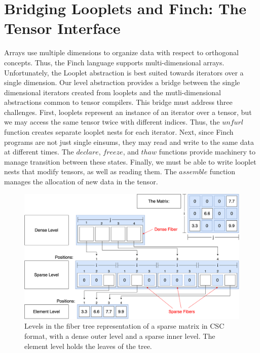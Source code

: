 \section{Bridging Looplets and Finch: The Tensor Interface}
%
%
%
%
Arrays use multiple dimensions to organize data with respect to orthogonal concepts.
%
Thus, the Finch language supports multi-dimensional arrays.
%
Unfortunately, the Looplet abstraction is best suited towards iterators over a single dimension.
%
Our level abstraction provides a bridge between the single dimensional iterators created from looplets and the mutli-dimensional abstractions common to tensor compilers.
% 
This bridge must address three challenges.
%
First, looplets represent an instance of an iterator over a tensor, but we may access the same tensor twice with different indices.
%
Thus, the $unfurl$ function creates separate looplet nests for each iterator.
%
Next, since Finch programs are not just single einsums, they may read and write to the same data at different times.
%
The $declare$, $freeze$, and $thaw$ functions provide machinery to manage transition between these states.
%
Finally, we must be able to write looplet nests that modify tensors, as well as reading them.
%
The $assemble$ function manages the allocation of new data in the tensor.

\begin{figure}
    \centering
    \vspace{-8pt}
    \includegraphics[width=\linewidth]{LevelsVsFibers-matrix.png}
    \vspace{-8pt}
    \caption{Levels in the fiber tree representation of a sparse matrix in CSC format, with a dense outer level and a sparse inner level. The element level holds the leaves of the tree.}
    \label{fig:levelsvsfibers}
    \vspace{-8pt}
\end{figure}

